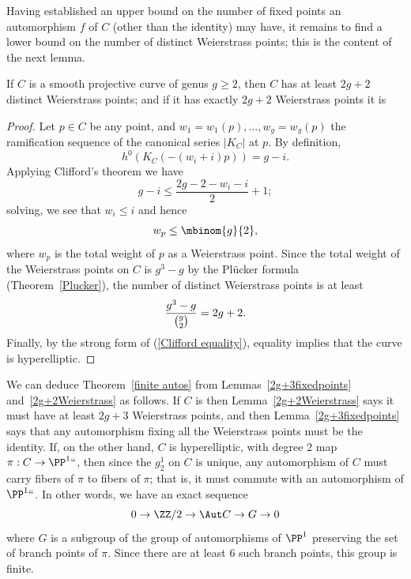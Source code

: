 Having established an upper  bound on the number of fixed points an
automorphism $f$ of $C$ (other than the identity) may have, it remains
to find a lower bound on the number of distinct Weierstrass points;
this is the content of the next lemma.


\begin{lemma}\label{2g+2Weierstrass}
If $C$ is a smooth projective curve of genus $g \geq 2$, then $C$ has at
least $2g+2$ distinct Weierstrass points; and if it has exactly $2g+2$
%
%
Weierstrass points it is 
\end{lemma}

\begin{proof}
Let $p \in C$ be any point, and $w_1=w_1(p),\dots,w_g = w_g(p)$
the ramification sequence of the canonical series $|K_C|$ at $p$. By
definition,
$$
h^0(K_C(-(w_i+i)p)) = g - i.
$$
Applying Clifford's theorem we have
$$
g-i \leq \frac{2g - 2 - w_i - i}{2} + 1;
$$
solving, we see that
$
w_i \leq i
$
and hence
$$
w_p \leq \mbinom{g}{2}
,
$$
where $w_p$ is the total weight of $p$ as a Weierstrass point. Since the
total weight of the Weierstrass points on $C$ is $g^3-g$ by the Pl\"ucker
formula (Theorem~\ref{Plucker}), the number of distinct Weierstrass points
is at least
$$
\frac{g^3-g}{\tbinom{g}{2}} = 2g+2.
$$
Finally, by the strong form of 
%
(\ref{Clifford
equality}), equality implies that the curve is hyperelliptic.
\end{proof}

We can deduce Theorem~\ref{finite autos} from Lemmas~\ref{2g+3fixedpoints}
and~\ref{2g+2Weierstrass} as follows. If $C$ is 
then
%
Lemma~\ref{2g+2Weierstrass} says it must have at least $2g+3$ Weierstrass
points, and then Lemma~\ref{2g+3fixedpoints} says that any automorphism
fixing all the Weierstrass points must be the identity. If, on the other
%
hand, $C$ is hyperelliptic, with degree 2 map $\pi : C \to \PP^1` `$,
then since the $g^1_2$ on $C$ is unique, any automorphism of $C$ must
carry fibers of $\pi$ to fibers of $\pi$; that is, it must commute with
an automorphism of $\PP^1` `$. In other words, we have an exact sequence
$$
0 \to \ZZ/2 \to \Aut C \to G \to 0
$$
where $G$ is a subgroup of the group of automorphisms of $\PP^1$
preserving  the set of branch points of $\pi$. Since there are at least
6 such branch points, this group is finite.

